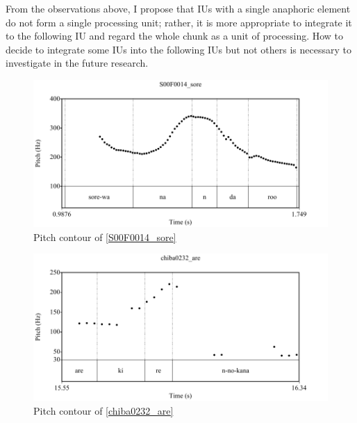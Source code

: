 From the observations above,
I propose that IUs with a single anaphoric element do not form a single processing unit;
rather, it is more appropriate to integrate it to the following IU and regard the whole chunk as a unit of processing.
How to decide to integrate some IUs into the following IUs but not others is necessary to investigate in the future research.



\begin{figure}
	\begin{center}
	\includegraphics[width=.95\textwidth]{sounds/S00F0014_sore.pdf}
	\caption{Pitch contour of \ref{S00F0014_sore}}
	\label{S00F0014_soreF}
	\end{center}
\end{figure}
\begin{figure}
	\begin{center}
	\includegraphics[width=.95\textwidth]{sounds/chiba0232_are.pdf}
	\caption{Pitch contour of \ref{chiba0232_are}}
	\label{chiba0232_areF}
	\end{center}
\end{figure}
